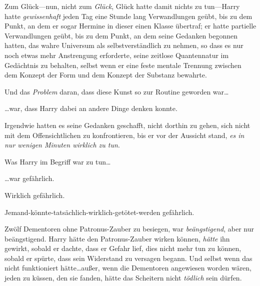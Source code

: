Zum Glück—nun, nicht zum \emph{Glück}, Glück hatte damit nichts zu tun—Harry hatte \emph{gewissenhaft} jeden Tag eine Stunde lang Verwandlungen geübt, bis zu dem Punkt, an dem er sogar Hermine in dieser einen Klasse übertraf; er hatte partielle Verwandlungen geübt, bis zu dem Punkt, an dem seine Gedanken begonnen hatten, das wahre Universum als selbstverständlich zu nehmen, so dass es nur noch etwas mehr Anstrengung erforderte, seine zeitlose Quantennatur im Gedächtnis zu behalten, selbst wenn er eine feste mentale Trennung zwischen dem Konzept der Form und dem Konzept der Substanz bewahrte.

Und das \emph{Problem} daran, dass diese Kunst so zur Routine geworden war…

…war, dass Harry dabei an andere Dinge denken konnte.

Irgendwie hatten es seine Gedanken geschafft, nicht dorthin zu gehen, sich nicht mit dem Offensichtlichen zu konfrontieren, bis er vor der Aussicht stand, \emph{es in nur wenigen Minuten wirklich zu tun}.

Was Harry im Begriff war zu tun…

…war gefährlich.

Wirklich gefährlich.

Jemand-könnte-tatsächlich-wirklich-getötet-werden gefährlich.

Zwölf Dementoren ohne Patronus-Zauber zu besiegen, war \emph{beängstigend}, aber nur beängstigend. Harry hätte den Patronus-Zauber wirken können, \emph{hätte} ihn gewirkt, sobald er dachte, dass er Gefahr lief, dies nicht mehr tun zu können, sobald er spürte, dass sein Widerstand zu versagen begann. Und selbst wenn das nicht funktioniert hätte…außer, wenn die Dementoren angewiesen worden wären, jeden zu küssen, den sie fanden, hätte das Scheitern nicht \emph{tödlich} sein dürfen.

